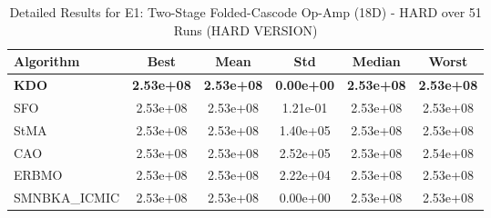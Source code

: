 \begin{table}[htbp]
\centering
\caption{Detailed Results for E1: Two-Stage Folded-Cascode Op-Amp (18D) - HARD over 51 Runs (HARD VERSION)}
\label{tab:P1_detailed}
\small
\begin{tabular}{lccccc}
\toprule
\textbf{Algorithm} & \textbf{Best} & \textbf{Mean} & \textbf{Std} & \textbf{Median} & \textbf{Worst} \\
\midrule
\textbf{KDO} & \textbf{2.53e+08} & \textbf{2.53e+08} & \textbf{0.00e+00} & \textbf{2.53e+08} & \textbf{2.53e+08} \\
SFO & 2.53e+08 & 2.53e+08 & 1.21e-01 & 2.53e+08 & 2.53e+08 \\
StMA & 2.53e+08 & 2.53e+08 & 1.40e+05 & 2.53e+08 & 2.53e+08 \\
CAO & 2.53e+08 & 2.53e+08 & 2.52e+05 & 2.53e+08 & 2.54e+08 \\
ERBMO & 2.53e+08 & 2.53e+08 & 2.22e+04 & 2.53e+08 & 2.53e+08 \\
SMNBKA_ICMIC & 2.53e+08 & 2.53e+08 & 0.00e+00 & 2.53e+08 & 2.53e+08 \\
\bottomrule
\end{tabular}
\end{table}
